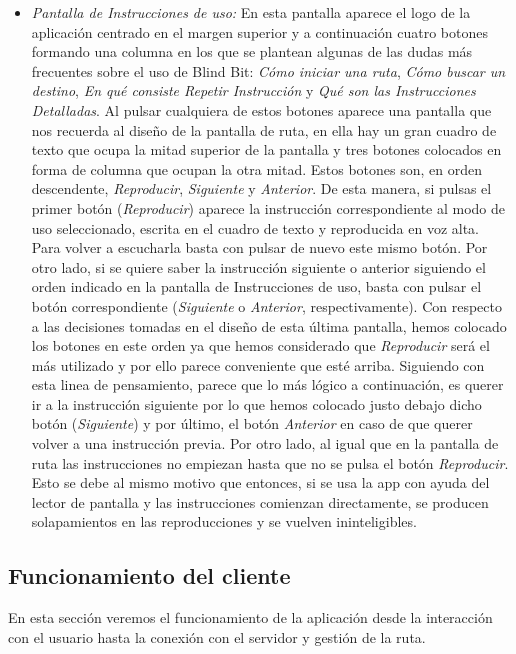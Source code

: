 \begin{itemize}
	\item \textit{Pantalla de Instrucciones de uso:} En esta pantalla aparece el logo de la aplicación centrado en el margen superior y a continuación cuatro botones formando una columna en los que se plantean algunas de las dudas más frecuentes sobre el uso de Blind Bit: \textit{Cómo iniciar una ruta}, \textit{Cómo buscar un destino}, \textit{En qué consiste Repetir Instrucción} y \textit{Qué son las Instrucciones Detalladas}. Al pulsar cualquiera de estos botones aparece una pantalla que nos recuerda al diseño de la pantalla de ruta, en ella hay un gran cuadro de texto que ocupa la mitad superior de la pantalla y tres botones colocados en forma de columna que ocupan la otra mitad. Estos botones son, en orden descendente, \textit{Reproducir}, \textit{Siguiente} y \textit{Anterior}. De esta manera, si pulsas el primer botón (\textit{Reproducir}) aparece la instrucción correspondiente al modo de uso seleccionado, escrita en el cuadro de texto y reproducida en voz alta. Para volver a escucharla basta con pulsar de nuevo este mismo botón. Por otro lado, si se quiere saber la instrucción siguiente o anterior siguiendo el orden indicado en la pantalla de Instrucciones de uso, basta con pulsar el botón correspondiente (\textit{Siguiente} o \textit{Anterior}, respectivamente). Con respecto a las decisiones tomadas en el diseño de esta última pantalla, hemos colocado los botones en este orden ya que hemos considerado que \textit{Reproducir} será el más utilizado y por ello parece conveniente que esté arriba. Siguiendo con esta linea de pensamiento, parece que lo más lógico a continuación, es querer ir a la instrucción siguiente por lo que hemos colocado justo debajo dicho botón (\textit{Siguiente}) y por último, el botón \textit{Anterior} en caso de que querer volver a una instrucción previa. Por otro lado, al igual que en la pantalla de ruta las instrucciones no empiezan hasta que no se pulsa el botón \textit{Reproducir}. Esto se debe al mismo motivo que entonces, si se usa la app con ayuda del lector de pantalla y las instrucciones comienzan directamente, se producen solapamientos en las reproducciones y se vuelven ininteligibles.
\end{itemize}



\subsection{Funcionamiento del cliente}
\label{sub:func_cliente}
En esta sección veremos el funcionamiento de la aplicación desde la interacción con el usuario hasta la conexión con el servidor y gestión de la ruta. 

